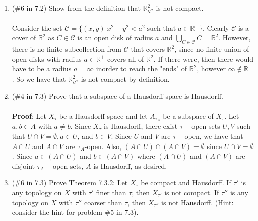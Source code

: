 \documentclass[12pt]{article}
\begin{document}
\begin{enumerate}
\item (\#6 in 7.2) Show from the definition that $\mathbb{R}^2_{\mathcal{U}^2}$ is not compact.\\\\

Consider the set $\mathcal{C}=\{(x,y)|x^2+y^2<a^2\; \text{such that}\; a\in\mathbb{R}^+\}$. Clearly $\mathcal{C}$ is a cover of $\mathbb{R}^2$ as $C\in\mathcal{C}$ is an open disk of radius $a$ and $\bigcup_{C\in\mathcal{C}}C=\mathbb{R}^2$. However, there is no finite subcollection from $\mathcal{C}$ that covers $\mathbb{R}^2$, since no finite union of open disks with radius $a\in\mathbb{R}^+$ covers all of $\mathbb{R}^2$. If there were, then there would have to be a radius $a=\infty$ inorder to reach the "ends" of $\mathbb{R}^2$, however $\infty\notin\mathbb{R}^+$. So we have that $\mathbb{R}^2_{\mathcal{U}^2}$ is not compact by definition.\\[20pt]

\item (\#4 in 7.3)  Prove that a subspace of a Hausdorff space is Hausdorff.\\\\

\textbf{Proof}: Let $X_{\tau}$ be a Hausdorff space and let $A_{\tau_A}$ be a subspace of $X_{\tau}$. Let $a,b\in A$ with $a\neq b$. Since $X_{\tau}$ is Hausdorff, there exist $\tau-$open sets $U,V$ such that $U\cap V=\emptyset, a\in U$, and $b\in V$. Since $U$ and $V$ are $\tau-$open, we have that $A\cap U$ and $A\cap V$ are $\tau_A$-open. Also, $(A\cap U)\cap(A\cap V)=\emptyset$ since $U\cap V=\emptyset$. Since $a\in(A\cap U)$ and $b\in(A\cap V)$ where $(A\cap U)$ and $(A\cap V)$ are disjoint $\tau_A-$open sets, $A$ is Hausdorff, as desired.\\[20pt]

\item (\#6 in 7.3) Prove Theorem 7.3.2: Let $X_{\tau}$ be compact and Hausdorff. If $\tau'$ is any topology on $X$ with $\tau'$ finer than $\tau$, then $X_{\tau'}$ is not compact. If $\tau''$ is any topology on $X$ with $\tau''$ coarser than $\tau$, then $X_{\tau''}$ is not Hausdorff. (Hint: consider the hint for problem \#5 in 7.3).\\\\


\end{enumerate}
\end{document}
